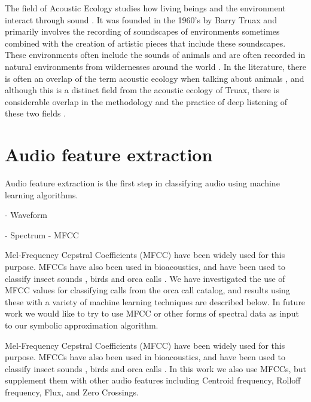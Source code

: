 The field of Acoustic Ecology studies how living beings and the
environment interact through sound \cite{wrightson2000introduction}.
It was founded in the 1960's by Barry Truax \cite{truax2001handbook}
and primarily involves the recording of soundscapes of environments
sometimes combined with the creation of artistic pieces
\cite{westerkamp2002linking} that include these soundscapes.  These
environments often include the sounds of animals and are often
recorded in natural environments from wildernesses
\cite{smith2004listening} around the world
\cite{feld1994ethnomusicology}.  In the literature, there is often an
overlap of the term acoustic ecology when talking about animals
\cite{nowacek2005acoustic} \cite{kroodsma1996ecology}, and although
this is a distinct field from the acoustic ecology of Truax, there is
considerable overlap in the methodology and the practice of deep
listening of these two fields \cite{redstrom1998acoustic}.




\section{Audio feature extraction}


Audio feature extraction is the first step in classifying audio using
machine learning algorithms.  

- Waveform







- Spectrum
	- MFCC

Mel-Frequency Cepstral Coefficients \cite{Logan00melfrequency} (MFCC)
have been widely used for this purpose.  MFCCs have also been used in
bioacoustics, and have been used to classify insect sounds
\cite{leqing11}, birds \cite{changhsing07} and orca calls
\cite{ness08}.  We have investigated the use of MFCC values for
classifying calls from the orca call catalog, and results using these
with a variety of machine learning techniques are described below.  In
future work we would like to try to use MFCC or other forms of
spectral data as input to our symbolic approximation algorithm.

Mel-Frequency Cepstral Coefficients
\cite{Logan00melfrequency} (MFCC) have been widely used for this
purpose.  MFCCs have also been used in bioacoustics, and have been
used to classify insect sounds \cite{leqing11}, birds
\cite{changhsing07} and orca calls \cite{ness2008}.  In this work we
also use MFCCs, but supplement them with other audio features
including Centroid frequency, Rolloff frequency, Flux, and
Zero Crossings.


